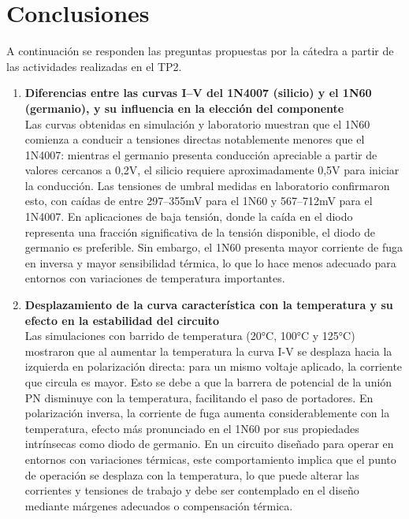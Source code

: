 \chapter{Conclusiones}
A continuación se responden las preguntas propuestas por la cátedra
a partir de las actividades realizadas en el TP2.
 
\begin{enumerate}[leftmargin=*, label=\textbf{\arabic*.}]
 
    \item \textbf{Diferencias entre las curvas I–V del 1N4007 (silicio) y el 1N60 (germanio), y su influencia en la elección del componente}\\
    Las curvas obtenidas en simulación y laboratorio muestran que el 1N60 comienza a conducir a tensiones directas notablemente menores que el 1N4007: mientras el germanio presenta conducción apreciable a partir de valores cercanos a 0,2V, el silicio requiere aproximadamente 0,5V para iniciar la conducción. Las tensiones de umbral medidas en laboratorio confirmaron esto, con caídas de entre 297--355mV para el 1N60 y 567--712mV para el 1N4007. En aplicaciones de baja tensión, donde la caída en el diodo representa una fracción significativa de la tensión disponible, el diodo de germanio es preferible. Sin embargo, el 1N60 presenta mayor corriente de fuga en inversa y mayor sensibilidad térmica, lo que lo hace menos adecuado para entornos con variaciones de temperatura importantes.

    \item \textbf{Desplazamiento de la curva característica con la temperatura y su efecto en la estabilidad del circuito}\\
    Las simulaciones con barrido de temperatura (20°C, 100°C y 125°C) mostraron que al aumentar la temperatura la curva I-V se desplaza hacia la izquierda en polarización directa: para un mismo voltaje aplicado, la corriente que circula es mayor. Esto se debe a que la barrera de potencial de la unión PN disminuye con la temperatura, facilitando el paso de portadores. En polarización inversa, la corriente de fuga aumenta considerablemente con la temperatura, efecto más pronunciado en el 1N60 por sus propiedades intrínsecas como diodo de germanio. En un circuito diseñado para operar en entornos con variaciones térmicas, este comportamiento implica que el punto de operación se desplaza con la temperatura, lo que puede alterar las corrientes y tensiones de trabajo y debe ser contemplado en el diseño mediante márgenes adecuados o compensación térmica.


\end{enumerate}
